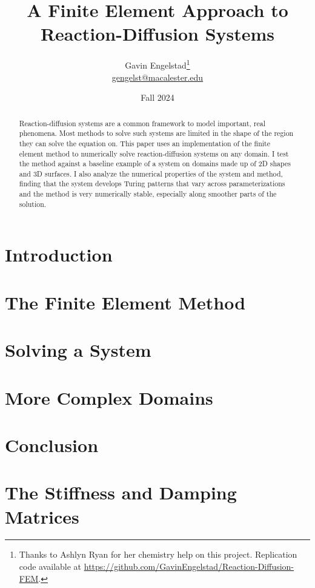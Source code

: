 \documentclass[11pt]{article}
\title{A Finite Element Approach to Reaction-Diffusion Systems}
\author{Gavin Engelstad\thanks{Thanks to Ashlyn Ryan for her chemistry help on this project. Replication code available at \url{https://github.com/GavinEngelstad/Reaction-Diffusion-FEM}.} \\ \href{mailto:gengelst@macalester.edu}{gengelst@macalester.edu}}
\date{Fall 2024}
\numberwithin{equation}{section} %
\numberwithin{figure}{section} %
\numberwithin{table}{section} %
\begin{document}
\maketitle

\begin{abstract}
    Reaction-diffusion systems are a common framework to model important, real phenomena. Most methods to solve such systems are limited in the shape of the region they can solve the equation on. This paper uses an implementation of the finite element method to numerically solve reaction-diffusion systems on any domain. I test the method against a baseline example of a system on domains made up of 2D shapes and 3D surfaces. I also analyze the numerical properties of the system and method, finding that the system develops Turing patterns that vary across parameterizations and the method is very numerically stable, especially along smoother parts of the solution. 
\end{abstract}


\section{Introduction} \label{sec:intro}


\section{The Finite Element Method} \label{sec:fem}



\section{Solving a System} \label{sec:sols}



\section{More Complex Domains} \label{sec:doms}



\section{Conclusion} \label{sec:concl}



\newpage
\printbibliography
\FloatBarrier


\newpage
\appendix

\section{The Stiffness and Damping Matrices} \label{app:mats}

\FloatBarrier
\end{document}
